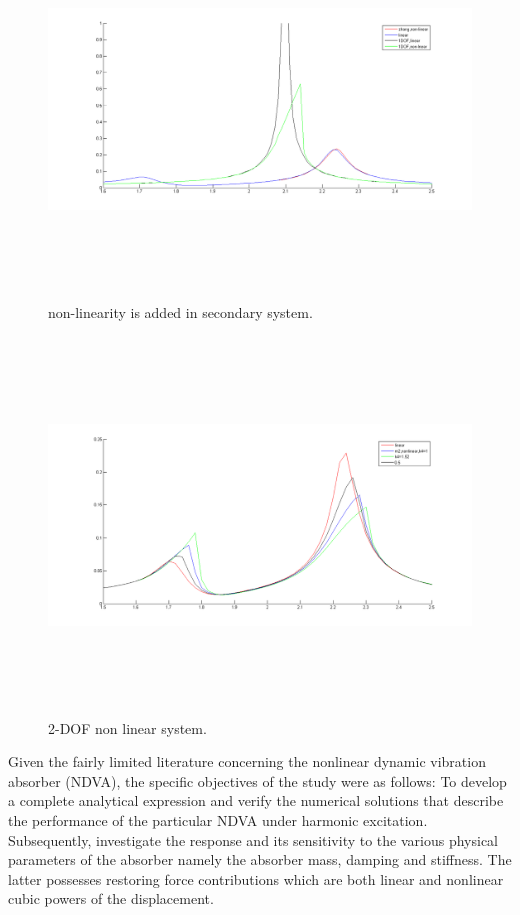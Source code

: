   \begin{figure}[h!]
\includegraphics[width=16cm,height=10cm]{"figures/33"}
  \caption{non-linearity is added in secondary system.}
  \label{fig:33}
  \end{figure}
  \begin{figure}[h!]
\includegraphics[width=16cm,height=10cm]{"figures/34"}
  \caption{2-DOF non linear system.}
  \label{fig:34}
  \end{figure}
  Given the fairly limited literature concerning the nonlinear dynamic vibration absorber (NDVA), the specific objectives of the study were as follows: 
To develop a complete analytical expression and verify the numerical solutions that describe the performance of the particular NDVA under harmonic excitation. Subsequently, investigate the response and its sensitivity to the various physical parameters of the absorber namely the absorber mass, damping and stiffness. The latter possesses restoring force contributions which are both linear and nonlinear cubic powers of the displacement. 
%